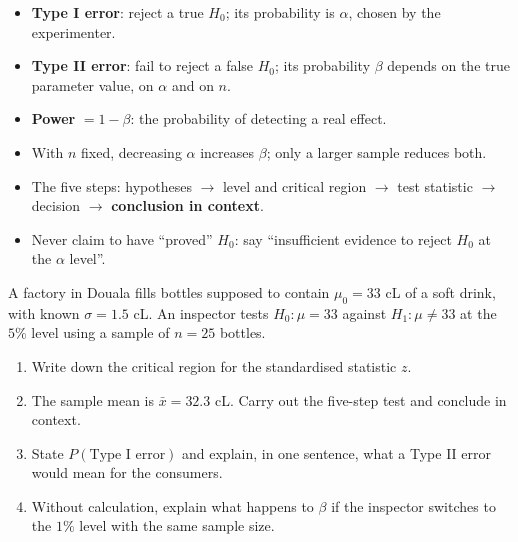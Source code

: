 \documentclass[11pt]{article}
\begin{document}
\begin{aretenir}
\begin{itemize}
\item \textbf{Type I error}: reject a true $H_0$; its probability is $\alpha$, chosen by the experimenter.
\item \textbf{Type II error}: fail to reject a false $H_0$; its probability $\beta$ depends on the true parameter value, on $\alpha$ and on $n$.
\item \textbf{Power} $=1-\beta$: the probability of detecting a real effect.
\item With $n$ fixed, decreasing $\alpha$ increases $\beta$; only a larger sample reduces both.
\item The five steps: hypotheses $\to$ level and critical region $\to$ test statistic $\to$ decision $\to$ \textbf{conclusion in context}.
\item Never claim to have ``proved'' $H_0$: say ``insufficient evidence to reject $H_0$ at the $\alpha$ level''.
\end{itemize}
\end{aretenir}

\begin{exercice}
A factory in Douala fills bottles supposed to contain $\mu_0=33$ cL of a soft drink, with known $\sigma=1.5$ cL. An inspector tests $H_0:\mu=33$ against $H_1:\mu\ne 33$ at the $5\%$ level using a sample of $n=25$ bottles.
\begin{enumerate}
\item Write down the critical region for the standardised statistic $z$.
\item The sample mean is $\bar{x}=32.3$ cL. Carry out the five-step test and conclude in context.
\item State $P(\text{Type I error})$ and explain, in one sentence, what a Type II error would mean for the consumers.
\item Without calculation, explain what happens to $\beta$ if the inspector switches to the $1\%$ level with the same sample size.
\end{enumerate}
\end{exercice}
\end{document}
